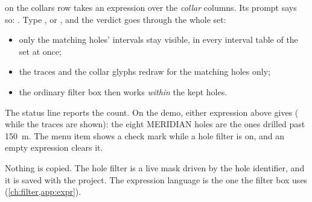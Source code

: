  on the  collars row takes an expression over the \emph{collar} columns. Its prompt says so: . Type , or , and the verdict goes through the whole set:

\begin{itemize}
\item only the matching holes' intervals stay visible, in every interval table of the set at once;
\item the traces and the collar glyphs redraw for the matching holes only;
\item the ordinary filter box then works \emph{within} the kept holes.
\end{itemize}

The status line reports the count. On the demo, either expression above gives  ( while the traces are shown): the eight MERIDIAN holes are the ones drilled past 150~m. The menu item shows a check mark while a hole filter is on, and an empty expression clears it.


Nothing is copied. The hole filter is a live mask driven by the hole identifier, and it is saved with the project. The expression language is the one the filter box uses (\cref{ch:filter,app:expr}).

